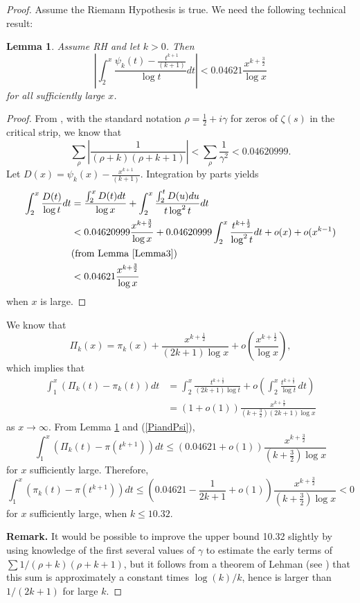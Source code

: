 \documentclass[12pt]{amsart}
\newtheorem{lemma}{Lemma}
\begin{document}
\begin{proof} Assume the Riemann Hypothesis is true. 
We need the following technical result:
\begin{lemma}\label{Lemma7} Assume RH and let $k>0$. Then
$$
\left|\int_2^x\frac{\psi_k(t) - \frac{t^{k+1}}{(k+1)}}{\log t}dt\right| < 0.04621\frac{x^{k+\frac32}}{\log x}
$$
for all sufficiently large $x$.
\end{lemma}
\begin{proof}
From \cite[Corollary 1]{BPT}, with the standard notation $\rho=\frac12+i\gamma$ for zeros of $\zeta(s)$ in the critical strip, we know that
$$
\sum_{\rho} \left| \frac{1}{(\rho+k)(\rho+k+1)} \right| < \sum_{\rho} \frac{1}{\gamma^2} < 0.04620999.
$$
Let $D(x) = \psi_k(x) - \frac{x^{k+1}}{(k+1)}$. Integration by parts yields
\begin{align*}
\int_2^x \frac{D(t)}{\log t} dt &= \frac{\int_2^x D(t)dt}{\log x} + \int_2^x \frac{\int_2^t D(u) du}{t\log^2 t} dt\\
&< 0.04620999 \frac{x^{k+\frac32}}{\log x}  + 0.04620999 \int_2^x \frac{t^{k+\frac12}}{\log^2 t} dt + o(x) +o(x^{k-1})\\
&(\text{from Lemma \ref{Lemma3}})\\
& < 0.04621  \frac{x^{k+\frac32}}{\log x} 
\end{align*}
when $x$ is large.
\end{proof}

We know that
$$
\Pi_k(x)=\pi_k(x)+\frac{x^{k+\frac12}}{(2k+1)\log x} + o\left(\frac{x^{k+\frac12}}{\log x}\right),
$$
which implies that
\begin{align*}
\int_1^x \left(\Pi_k(t)-\pi_k(t)\right) dt &= \int_2^x \frac{t^{k+\frac12}}{(2k+1)\log t} + o\left(\int_2^x \frac{t^{k+\frac12}}{\log t}\, dt\right) \\
&= (1+o(1)) \frac{x^{k+\frac32}}{(k+\frac32)(2k+1)\log x} 
\end{align*}
as $x\to\infty$.
From Lemma \ref{Lemma7} and (\ref{PiandPsi}),
$$
\int_1^x \left(\Pi_k(t) - \pi(t^{k+1})\right) dt \le  (0.04621+o(1)) \frac{x^{k+\frac32}}{(k+\frac32)\log x}
$$
for $x$ sufficiently large.
Therefore, 
$$
\int_1^x \left(\pi_k(t) - \pi(t^{k+1})\right) dt \le \left(0.04621-\frac{1}{2k+1}+o(1)\right) \frac{x^{k+\frac32}}{(k+\frac32)\log x} < 0
$$
for $x$ sufficiently large, when $k\le 10.32$.
\medskip

\noindent
{\bf Remark.} It would be possible to improve the upper bound 10.32 slightly by using knowledge of the first several values of $\gamma$ to estimate
the early terms of $\sum 1/(\rho+k)(\rho+k+1)$, but it follows from a theorem of Lehman (see \cite{BPT}) that this sum is approximately a constant times $\log(k)/k$, hence is larger than $1/(2k+1)$
for large $k$.
\medskip


\end{proof}
\end{document}
